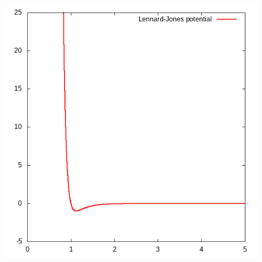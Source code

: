 \documentclass[14pt,a4paper,report]{ncc}
\begin{document}
\includegraphics[scale=0.8]{plot_lgpotential}
\end{document}
